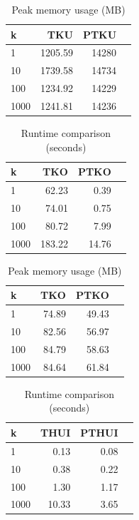 \begin{table}[H]
\caption{Peak memory usage (MB)}\label{tab:memory}
\centering
\begin{tabular}{@{}lrrr@{}}
\toprule
\textbf{k} & \textbf{TKU} & \textbf{PTKU} \\
\midrule
1 & 1205.59 & 14280  \\
10 & 1739.58 & 14734  \\
100 & 1234.92 & 14229 \\
1000 & 1241.81 & 14236 \\

\bottomrule
\end{tabular}
\end{table}

\begin{table}[H]
\caption{Runtime comparison (seconds)}\label{tab:runtime}
\centering
\begin{tabular}{@{}lrrr@{}}
\toprule
\textbf{k} & \textbf{TKO} & \textbf{PTKO} \\
\midrule
1 & 62.23 & 0.39 \\
10 & 74.01 & 0.75 \\
100 & 80.72 & 7.99 \\
1000 & 183.22 & 14.76 \\
\bottomrule
\end{tabular}
\end{table}

\begin{table}[H]
\caption{Peak memory usage (MB)}\label{tab:memory}
\centering
\begin{tabular}{@{}lrrr@{}}
\toprule
\textbf{k} & \textbf{TKO} & \textbf{PTKO} \\
\midrule
1 & 74.89 & 49.43 \\
10 & 82.56 & 56.97 \\
100 & 84.79 & 58.63 \\
1000 & 84.64 & 61.84 \\
\bottomrule
\end{tabular}
\end{table}

\begin{table}[H]
\caption{Runtime comparison (seconds)}\label{tab:runtime}
\centering
\begin{tabular}{@{}lrrr@{}}
\toprule
\textbf{k} & \textbf{THUI} & \textbf{PTHUI}\\
\midrule
1 & 0.13 & 0.08 \\
10 & 0.38 & 0.22 \\
100 & 1.30 & 1.17 \\
1000 & 10.33 & 3.65 \\
\bottomrule
\end{tabular}
\end{table}

